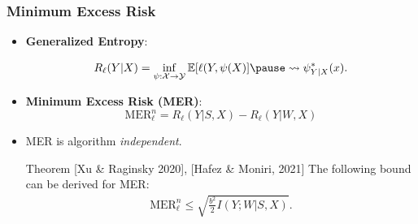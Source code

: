\documentclass[usenames,dvipsnames, 10pt]{beamer}
\newcommand{\E}{\mathbb{E}}
\begin{document}
\begin{frame}
	\frametitle{Minimum Excess Risk}
	\begin{itemize}
		\item \textbf{Generalized Entropy}: 
		
		$$R_{\ell}(Y|X)= \inf_{\psi:\mathcal{X}\to\mathcal{Y}} \E[\ell(Y,\psi(X)] \pause \leadsto  \psi^*_{Y|X}(x).$$
		\pause
		
				\item \textbf{Minimum Excess Risk (MER)}:
		\begin{equation*}
		\mathrm{MER}_\ell^n = R_\ell(Y|S, X) - R_\ell(Y|W, X)
		\end{equation*}
		\pause
		\vspace{-0.5cm}
		\item MER is algorithm \textit{independent}.
		\pause
		\begin{exampleblock}{Theorem {\scriptsize[Xu \& Raginsky 2020],  [Hafez \& Moniri, 2021]}} The following bound can be derived for MER:
			\begin{align*}
			\text{MER}_\ell^n \le \sqrt{\frac{b^2}{2} I(Y;W|S,X) }.
			\end{align*}
		\end{exampleblock}
		
	\end{itemize}	
\end{frame}
\end{document}
